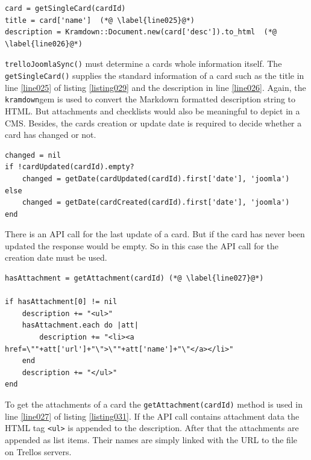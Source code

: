 \begin{lstlisting}[aboveskip=1\baselineskip, caption=Getting standard card information., label=listing029]
card = getSingleCard(cardId)
title = card['name']  (*@ \label{line025}@*)
description = Kramdown::Document.new(card['desc']).to_html  (*@ \label{line026}@*)
\end{lstlisting}

\lstinline{trelloJoomlaSync()} must determine a cards whole information itself. The \lstinline{getSingleCard()} supplies the standard information of a card such as the title in line \ref{line025} of listing \ref{listing029} and the description in line \ref{line026}. Again, the \texttt{kramdown}gem is used to convert the Markdown formatted description string to HTML. But attachments and checklists would also be meaningful to depict in a CMS. Besides, the cards creation or update date is required to decide whether a card has changed or not.

\begin{lstlisting}[aboveskip=1\baselineskip, caption=Getting the date of a cards last change., label=listing030]
changed = nil
if !cardUpdated(cardId).empty?
	changed = getDate(cardUpdated(cardId).first['date'], 'joomla')
else
	changed = getDate(cardCreated(cardId).first['date'], 'joomla')
end
\end{lstlisting}
There is an API call for the last update of a card. But if the card has never been updated the response would be empty. So in this case the API call for the creation date must be used.

\begin{lstlisting}[aboveskip=1\baselineskip, caption=Processing the attachments of a card., label=listing031]
hasAttachment = getAttachment(cardId) (*@ \label{line027}@*)

if hasAttachment[0] != nil
	description += "<ul>"		
	hasAttachment.each do |att|	
		description += "<li><a href=\""+att['url']+"\">\""+att['name']+"\"</a></li>"
	end
	description += "</ul>"
end
\end{lstlisting}

To get the attachments of a card the \lstinline{getAttachment(cardId)} method is used in line \ref{line027} of listing \ref{listing031}. If the API call contains attachment data the HTML tag \lstinline{<ul>} is appended to the description. After that the attachments are appended as list items. Their names are simply linked with the URL to the file on Trellos servers.  

